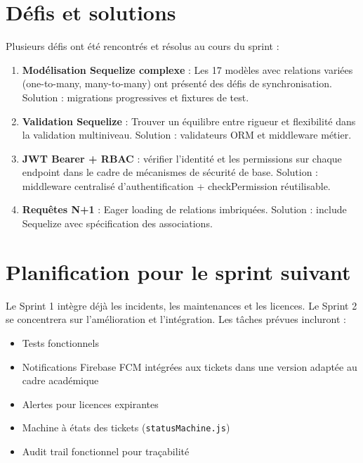 \section{Défis et solutions}
\label{subsec:defis_sprint1}

Plusieurs défis ont été rencontrés et résolus au cours du sprint :

\begin{enumerate}
    \item \textbf{Modélisation Sequelize complexe} : Les 17 modèles avec relations variées (one-to-many, many-to-many) ont présenté des défis de synchronisation. Solution : migrations progressives et fixtures de test.
    
    \item \textbf{Validation Sequelize} : Trouver un équilibre entre rigueur et flexibilité dans la validation multiniveau. Solution : validateurs ORM et middleware métier.
    
    \item \textbf{JWT Bearer + RBAC} : vérifier l'identité et les permissions sur chaque endpoint dans le cadre de mécanismes de sécurité de base. Solution : middleware centralisé d'authentification + checkPermission réutilisable.
    
    \item \textbf{Requêtes N+1} : Eager loading de relations imbriquées. Solution : include Sequelize avec spécification des associations.
\end{enumerate}

\section{Planification pour le sprint suivant}
\label{sec:plan_sprint2}

Le Sprint 1 intègre déjà les incidents, les maintenances et les licences. Le Sprint 2 se concentrera sur l’amélioration et l’intégration. Les tâches prévues incluront :
\begin{itemize}
    \item Tests fonctionnels
    \item Notifications Firebase FCM intégrées aux tickets dans une version adaptée au cadre académique
    \item Alertes pour licences expirantes
    \item Machine à états des tickets (\texttt{statusMachine.js})
    \item Audit trail fonctionnel pour traçabilité
\end{itemize}

